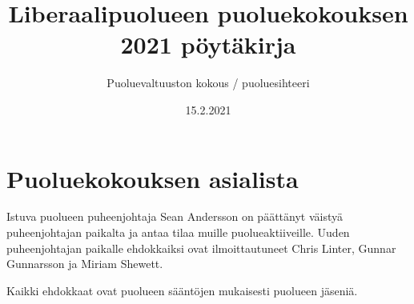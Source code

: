 \documentclass{article}
\title{Liberaalipuolueen puoluekokouksen 2021 pöytäkirja}
\author{Puoluevaltuuston kokous / puoluesihteeri}
\date{15.2.2021}
\begin{document}
	
	\maketitle
	
	\section{Puoluekokouksen asialista}
	
	Istuva puolueen puheenjohtaja Sean Andersson on päättänyt väistyä puheenjohtajan paikalta ja antaa tilaa muille puolueaktiiveille. Uuden puheenjohtajan paikalle ehdokkaiksi ovat ilmoittautuneet Chris Linter, Gunnar Gunnarsson ja Miriam Shewett.
	
	\vspace{12pt}
	Kaikki ehdokkaat ovat puolueen sääntöjen mukaisesti puolueen jäseniä.
\end{document}
